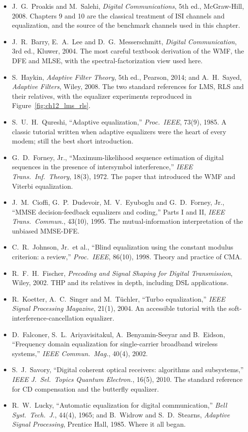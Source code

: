 \furtherreading
\begin{itemize}
\item J.~G.~Proakis and M.~Salehi, \emph{Digital Communications}, 5th ed., McGraw-Hill, 2008. Chapters 9
and 10 are the classical treatment of ISI channels and equalization, and the source of the benchmark
channels used in this chapter.
\item J.~R.~Barry, E.~A.~Lee and D.~G.~Messerschmitt, \emph{Digital Communication}, 3rd ed., Kluwer,
2004. The most careful textbook derivation of the WMF, the DFE and MLSE, with the spectral-factorization
view used here.
\item S.~Haykin, \emph{Adaptive Filter Theory}, 5th ed., Pearson, 2014; and A.~H.~Sayed,
\emph{Adaptive Filters}, Wiley, 2008. The two standard references for LMS, RLS and their relatives, with
the equalizer experiments reproduced in Figure~\ref{fig:ch12_lms_rls}.
\item S.~U.~H.~Qureshi, ``Adaptive equalization,'' \emph{Proc.\ IEEE}, 73(9), 1985. A classic tutorial
written when adaptive equalizers were the heart of every modem; still the best short introduction.
\item G.~D.~Forney, Jr., ``Maximum-likelihood sequence estimation of digital sequences in the presence of
intersymbol interference,'' \emph{IEEE Trans.\ Inf.\ Theory}, 18(3), 1972. The paper that introduced the
WMF and Viterbi equalization.
\item J.~M.~Cioffi, G.~P.~Dudevoir, M.~V.~Eyuboglu and G.~D.~Forney, Jr., ``MMSE decision-feedback
equalizers and coding,'' Parts I and II, \emph{IEEE Trans.\ Commun.}, 43(10), 1995. The
mutual-information interpretation of the unbiased MMSE-DFE.
\item C.~R.~Johnson, Jr.\ et al., ``Blind equalization using the constant modulus criterion: a review,''
\emph{Proc.\ IEEE}, 86(10), 1998. Theory and practice of CMA.
\item R.~F.~H.~Fischer, \emph{Precoding and Signal Shaping for Digital Transmission}, Wiley, 2002. THP and its
relatives in depth, including DSL applications.
\item R.~Koetter, A.~C.~Singer and M.~T\"uchler, ``Turbo equalization,'' \emph{IEEE Signal Processing
Magazine}, 21(1), 2004. An accessible tutorial with the soft-interference-cancellation equalizer.
\item D.~Falconer, S.~L.~Ariyavisitakul, A.~Benyamin-Seeyar and B.~Eidson, ``Frequency domain equalization
for single-carrier broadband wireless systems,'' \emph{IEEE Commun.\ Mag.}, 40(4), 2002.
\item S.~J.~Savory, ``Digital coherent optical receivers: algorithms and subsystems,'' \emph{IEEE J.\ Sel.\
Topics Quantum Electron.}, 16(5), 2010. The standard reference for CD compensation and the butterfly
equalizer.
\item R.~W.~Lucky, ``Automatic equalization for digital communication,'' \emph{Bell Syst.\ Tech.\ J.},
44(4), 1965; and B.~Widrow and S.~D.~Stearns, \emph{Adaptive Signal Processing}, Prentice Hall, 1985. Where
it all began.
\end{itemize}
